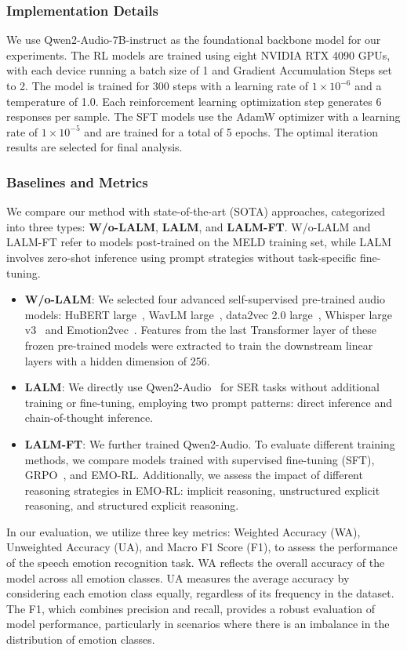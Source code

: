 \documentclass[11pt]{article}
\begin{document}
\subsubsection{Implementation Details}
We use Qwen2-Audio-7B-instruct as the foundational backbone model for our experiments.
The RL models are trained using eight NVIDIA RTX 4090 GPUs, with each device running a batch size of 1 and Gradient Accumulation Steps set to 2.
The model is trained for 300 steps with a learning rate of $1 \times 10^{-6}$ and a temperature of 1.0.
Each reinforcement learning optimization step generates 6 responses per sample.
The SFT models use the AdamW optimizer with a learning rate of $1 \times 10^{-5}$ and are trained for a total of 5 epochs.
The optimal iteration results are selected for final analysis.

\subsubsection{Baselines and Metrics}
We compare our method with state-of-the-art (SOTA) approaches, categorized into three types: \textbf{W/o-LALM}, \textbf{LALM}, and \textbf{LALM-FT}.
W/o-LALM and LALM-FT refer to models post-trained on the MELD training set, while LALM involves zero-shot inference using prompt strategies without task-specific fine-tuning.
\begin{itemize}[leftmargin=10pt]
	\item \textbf{W/o-LALM}: We selected four advanced self-supervised pre-trained audio models: HuBERT large~\cite{hsu2021hubert}, WavLM large~\cite{chen2022wavlm}, data2vec 2.0 large~\cite{baevski2023efficient}, Whisper large v3~\cite{radford2023robust} and Emotion2vec~\cite{ma2023emotion2vec}. Features from the last Transformer layer of these frozen pre-trained models were extracted to train the downstream linear layers with a hidden dimension of 256.
	\item \textbf{LALM}: We directly use Qwen2-Audio~\cite{chu2024qwen2} for SER tasks without additional training or fine-tuning, employing two prompt patterns: direct inference and chain-of-thought inference.
	\item \textbf{LALM-FT}: We further trained Qwen2-Audio. To evaluate different training methods, we compare models trained with supervised fine-tuning (SFT), GRPO~\cite{shao2024deepseekmath}, and EMO-RL. Additionally, we assess the impact of different reasoning strategies in EMO-RL: implicit reasoning, unstructured explicit reasoning, and structured explicit reasoning.
\end{itemize}
In our evaluation, we utilize three key metrics: Weighted Accuracy (WA), Unweighted Accuracy (UA), and Macro F1 Score (F1), to assess the performance of the speech emotion recognition task. WA reflects the overall accuracy of the model across all emotion classes.
UA measures the average accuracy by considering each emotion class equally, regardless of its frequency in the dataset.
The F1, which combines precision and recall, provides a robust evaluation of model performance, particularly in scenarios where there is an imbalance in the distribution of emotion classes.
\end{document}
